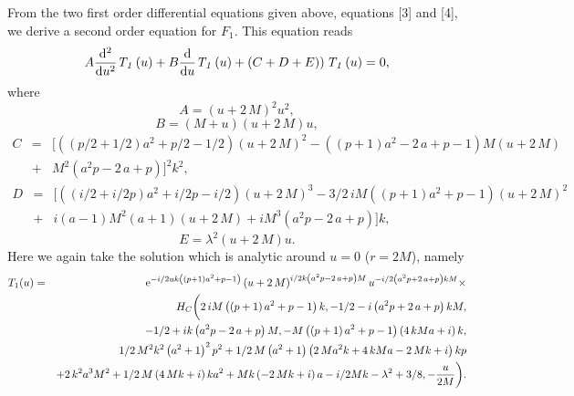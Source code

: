 \documentclass{article}
\begin{document}
From the two first order differential equations given above, equations [3] and [4], we derive a second order equation for $F_1$. This equation reads
\begin{equation}
A {\frac {{\rm d}^{2}}{{\rm d}{u}^{ 2}}}{\it T_1} \left( u \right)
+ B {\frac {\rm d}{{\rm d}u}}{\it T_1} \left( u \right) + \left(
C+D+E)\right) {\it T_1} \left( u \right) = 0,
\end{equation}
where
\begin{equation}
A= \left( u+2\,M \right) ^{2}{u}^{2},
\end{equation}
\begin{equation}
 B=\left( M+u \right) \left( u+2\,M
 \right) u,
\end{equation}
\begin{eqnarray}\nonumber
C&=&[  \left(  \left( p/2+1/2 \right) {a}^{2}+p/2-1/2
 \right)  \left( u+2\,M \right) ^{2}- \left(  \left( p+1 \right) {a}^{
2}-2\,a+p-1 \right) M \left( u+2\,M \right) \\ &+& {M}^{2} \left(
{a}^{2}p-2 \,a+p \right)] ^{2}{k}^{2},
\end{eqnarray}
\begin{eqnarray}\nonumber
D &=&[\left(  \left( i/2+i/2p
 \right) {a}^{2}+i/2p-i/2 \right)  \left( u+2\,M \right) ^{3}-3/2\,iM
 \left(  \left( p+1 \right) {a}^{2}+p-1 \right)  \left( u+2\,M
 \right)^{2} \\ &+& i \left( a-1 \right) {M}^{2} \left( a+1 \right)  \left(
u+2\,M \right) +i{M}^{3} \left( {a}^{2}p-2\,a+p \right) ]k,
\end{eqnarray}
\begin{equation}
E={\lambda}^{2} \left( u+2\,M \right) u.
\end{equation}
Here we again take the solution which is analytic around $u=0$
($r=2M$), namely
\begin{eqnarray}
T_1(u) &=&{{\rm e}^{-i/2uk \left(  \left( p+1 \right) {a}^{2}+p-1 \right) }} \left( u+2\,M \right)^{i/2k \left( {a}^{2}p-2\,a+p \right) M}{u}^{-i/2 \left( {a}^{2}p+2\,a
+p \right) kM} \times \nonumber \\
&&{H_C} \bigg( 2\,iM \left(  \left( p+1 \right) {a}^{2}+p-1
 \right) k,-1/2-i \left( {a}^{2}p+2\,a+p \right) kM, \nonumber \\
&& -1/2+ik \left( {a}
^{2}p-2\,a+p \right) M,-M \left(  \left( p+1 \right) {a}^{2}+p-1
 \right)  \left( 4\,kMa+i \right) k, \\
&& 1/2\,{M}^{2}{k}^{2} \left( {a}^{2}
+1 \right) ^{2}{p}^{2}+1/2\,M \left( {a}^{2}+1 \right)  \left( 2\,M{a}
^{2}k+4\,kMa-2\,Mk+i \right) kp \nonumber \\
&& +2\,{k}^{2}{a}^{3}{M}^{2}+1/2\,M
 \left( 4\,Mk+i \right) k{a}^{2}+Mk \left( -2\,Mk+i \right) a-i/2Mk-{
\lambda}^{2}+3/8,-{\frac {u}{2M}} \bigg) . \nonumber
\end{eqnarray}
\end{document}
